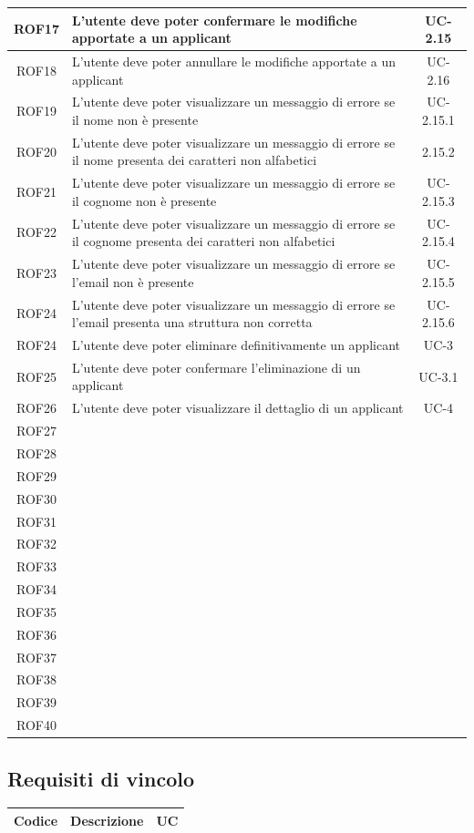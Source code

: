 \begin{center}
\begin{tabularx}{\textwidth}{|c|X|c|}
		\hline
		ROF17 & L'utente deve poter confermare le modifiche apportate a un applicant & UC-2.15 \\
		\hline
		ROF18 & L'utente deve poter annullare le modifiche apportate a un applicant &  UC-2.16\\
		\hline
		ROF19 & L'utente deve poter visualizzare un messaggio di errore se il nome non è presente & UC-2.15.1 \\
		\hline
		ROF20 & L'utente deve poter visualizzare un messaggio di errore se il nome presenta dei caratteri non alfabetici & 2.15.2 \\
		\hline
		ROF21 & L'utente deve poter visualizzare un messaggio di errore se il cognome non è presente & UC-2.15.3 \\
		\hline
		ROF22 & L'utente deve poter visualizzare un messaggio di errore se il cognome presenta dei caratteri non alfabetici & UC-2.15.4\\
		\hline
		ROF23 & L'utente deve poter visualizzare un messaggio di errore se l'email non è presente & UC-2.15.5\\
		\hline
		ROF24 & L'utente deve poter visualizzare un messaggio di errore se l'email presenta una struttura non corretta & UC-2.15.6\\
		\hline
		ROF24 & L'utente deve poter eliminare definitivamente un applicant & UC-3 \\
		\hline
		ROF25 & L'utente deve poter confermare l'eliminazione di un applicant & UC-3.1 \\
		\hline
		ROF26 & L'utente deve poter visualizzare il dettaglio di un applicant & UC-4 \\
		\hline
		ROF27 & & \\
		\hline
		ROF28 & & \\
		\hline
		ROF29 & & \\
		\hline
		ROF30 & & \\
		\hline
		ROF31 & & \\
		\hline
		ROF32 & & \\
		\hline
		ROF33 & & \\
		\hline
		ROF34 & & \\
		\hline
		ROF35 & & \\
		\hline
		ROF36 & & \\
		\hline
		ROF37 & & \\
		\hline
		ROF38 & & \\
		\hline
		ROF39 & & \\
		\hline
		ROF40 & & \\
		\hline
		 
	\end{tabularx}
\end{center}


\subsection{Requisiti di vincolo}
\begin{center}
	\begin{tabularx}{\textwidth}{|c|X|c|}
		\hline
		\textbf{Codice} & \textbf{Descrizione} & \textbf{UC} \\
		\hline
	\end{tabularx}
\end{center}



